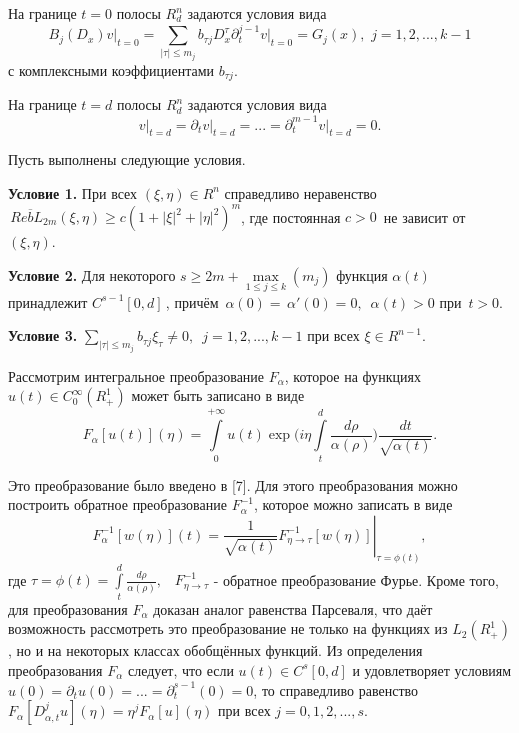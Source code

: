 На границе $t = 0$ полосы $R_d^n $ задаются условия вида
\begin{equation}
\label{eq4501}
B_j (D_x )\left. v \right|_{t = 0} = \!\!\! \sum\limits_{\left| \tau \right| \leqslant
m_j } {b_{\tau j} D_x^\tau \partial _t^{j - 1} \left. v \right|_{t = 0} =
G_j (x)} ,\,\,j = 1,2,...,k - 1
\end{equation}
с комплексными коэффициентами $b_{\tau j} $.

На границе $t = d$ полосы $R_d^n $ задаются условия вида
\begin{equation}
\label{eq4502}
\left. v \right|_{t = d} = \partial _t \left. v \right|_{t = d} = ... =
\partial _t^{m - 1} \left. v \right|_{t = d} = 0.
\end{equation}

Пусть выполнены следующие условия.

\textbf{Условие 1.} При всех $(\xi ,\eta ) \in R^n$ справедливо неравенство
$\,Re\overline b L_{2m} (\xi ,\eta ) \geqslant c(1 + \left| \xi \right|^2 + \left|
\eta \right|^2)^m$, где постоянная $c > 0\,$ не зависит от $(\xi ,\eta )$.

\textbf{Условие 2.} Для некоторого $s \geqslant 2m + \mathop {\max }\limits_{1 \leqslant
j \leqslant k} (m_j )$ функция $\alpha (t)$ принадлежит $C^{s - 1}[0,d]\,$, причём
$\,\alpha (0) = \,\alpha '(0) = 0,\,\,\,\alpha (t) > 0$ при $\,t > 0$.

\textbf{Условие 3.}
$\sum\limits_{\left| \tau \right| \leqslant m_j } {b_{\tau
j} \xi _\tau \ne 0,\,\,} \,j = 1,2,...,k - 1$ при всех $\xi \in R^{n - 1}$.

Рассмотрим интегральное преобразование $F_\alpha $, которое на функциях
$u(t) \in C_0^\infty (R_ + ^1 )$ может быть записано в виде
\[
F_\alpha [u(t)](\eta ) = \int\limits_0^{ + \infty } {u(t)\exp (i\eta }
\int\limits_t^d {\frac{d\rho }{\alpha (\rho )}} )\frac{dt}{\sqrt {\alpha
(t)} }.
\]

Это преобразование было введено в [7]. Для этого преобразования можно
построить обратное преобразование $F_\alpha ^{ - 1} $, которое можно
записать в виде
$$F_\alpha ^{ - 1} [w(\eta )](t) = \left. {\frac{1}{\sqrt
{\alpha (t)} }F_{\eta \to \tau }^{ - 1} [w(\eta )]} \right|_{\tau = \phi
(t)} ,$$ где $\tau = \phi (t) = \int\limits_t^d {\frac{d\rho }{\alpha (\rho
)}} ,\,\,\,\,\,F_{\eta \to \tau }^{ - 1} $ - обратное преобразование Фурье.
Кроме того, для преобразования $F_\alpha $ доказан аналог равенства
Парсеваля, что даёт возможность рассмотреть это преобразование не только на
функциях из $L_2 (R_ + ^1 )$, но и на некоторых классах обобщённых функций.
Из определения преобразования $F_\alpha $ следует, что если $u\left( t
\right) \in C^s\left[ {0,d} \right]$ и удовлетворяет условиям $u\left( 0
\right) = \partial _t u\left( 0 \right) = ... = \partial _t^{s - 1} \left( 0
\right) = 0$,
то справедливо равенство $F_\alpha \left[ {D_{\alpha ,t}^j u} \right]\left(
\eta \right) = \eta ^jF_\alpha \left[ u \right]\left( \eta \right)$ при всех
$j = 0,1,2,...,s$.


